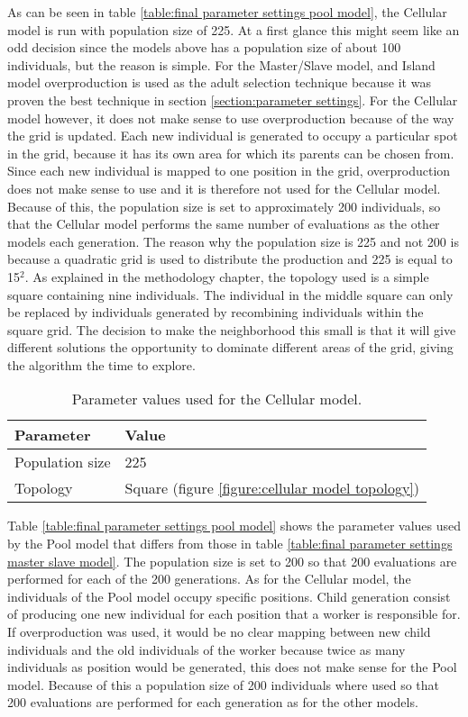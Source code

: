 \noindent As can be seen in table \ref{table:final parameter settings pool model}, the Cellular model is run with population size of 225. At a first glance this might seem like an odd decision since the models above has a population size of about 100 individuals, but the reason is simple. For the Master/Slave model, and Island model overproduction is used as the adult selection technique because it was proven the best technique in section \ref{section:parameter settings}. For the Cellular model however, it does not make sense to use overproduction because of the way the grid is updated. Each new individual is generated to occupy a particular spot in the grid, because it has its own area for which its parents can be chosen from. Since each new individual is mapped to one position in the grid, overproduction does not make sense to use and it is therefore not used for the Cellular model. Because of this, the population size is set to approximately 200 individuals, so that the Cellular model performs the same number of evaluations as the other models each generation. The reason why the population size is 225 and not 200 is because a quadratic grid is used to distribute the production and 225 is equal to 15$^{2}$. As explained in the methodology chapter, the topology used is a simple square containing nine individuals. The individual in the middle square can only be replaced by individuals generated by recombining individuals within the square grid. The decision to make the neighborhood this small is that it will give different solutions the opportunity to dominate different areas of the grid, giving the algorithm the time to explore.\\


\begin{table}
\centering
\caption{Parameter values used for the Cellular model.}
\label{table:final parameter settings cellular model}
\begin{tabular}{l|l}
\textbf{Parameter} & \textbf{Value} \\ 
\hline 
Population size & 225 \\
Topology & Square (figure \ref{figure:cellular model topology}) \\  
\end{tabular}
\end{table}

\noindent Table \ref{table:final parameter settings pool model} shows the parameter values used by the Pool model that differs from those in table \ref{table:final parameter settings master slave model}. The population size is set to 200 so that 200 evaluations are performed for each of the 200 generations. As for the Cellular model, the individuals of the Pool model occupy specific positions. Child generation consist of producing one new individual for each position that a worker is responsible for. If overproduction was used, it would be no clear mapping between new child individuals and the old individuals of the worker because twice as many individuals as position would be generated, this does not make sense for the Pool model. Because of this a population size of 200 individuals where used so that 200 evaluations are performed for each generation as for the other models.\\

